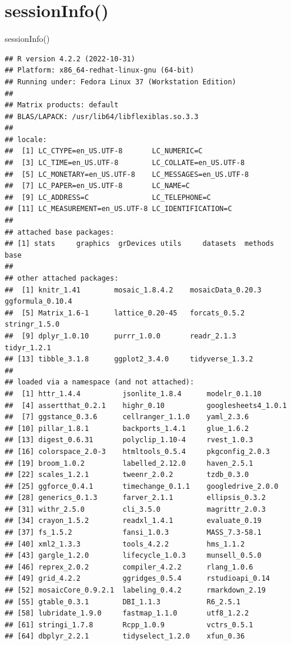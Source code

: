 \documentclass[
  10pt,
]{article}
\newenvironment{Shaded}{\begin{snugshade}}{\end{snugshade}}
\newcommand{\FunctionTok}[1]{\textcolor[rgb]{0.00,0.00,0.00}{#1}}
\newcommand{\NormalTok}[1]{#1}
\begin{document}
\hypertarget{sessioninfo}{%
\section{sessionInfo()}\label{sessioninfo}}

\begin{Shaded}
\begin{Highlighting}[]
\FunctionTok{sessionInfo}\NormalTok{()}
\end{Highlighting}
\end{Shaded}

\begin{verbatim}
## R version 4.2.2 (2022-10-31)
## Platform: x86_64-redhat-linux-gnu (64-bit)
## Running under: Fedora Linux 37 (Workstation Edition)
## 
## Matrix products: default
## BLAS/LAPACK: /usr/lib64/libflexiblas.so.3.3
## 
## locale:
##  [1] LC_CTYPE=en_US.UTF-8       LC_NUMERIC=C              
##  [3] LC_TIME=en_US.UTF-8        LC_COLLATE=en_US.UTF-8    
##  [5] LC_MONETARY=en_US.UTF-8    LC_MESSAGES=en_US.UTF-8   
##  [7] LC_PAPER=en_US.UTF-8       LC_NAME=C                 
##  [9] LC_ADDRESS=C               LC_TELEPHONE=C            
## [11] LC_MEASUREMENT=en_US.UTF-8 LC_IDENTIFICATION=C       
## 
## attached base packages:
## [1] stats     graphics  grDevices utils     datasets  methods   base     
## 
## other attached packages:
##  [1] knitr_1.41        mosaic_1.8.4.2    mosaicData_0.20.3 ggformula_0.10.4 
##  [5] Matrix_1.6-1      lattice_0.20-45   forcats_0.5.2     stringr_1.5.0    
##  [9] dplyr_1.0.10      purrr_1.0.0       readr_2.1.3       tidyr_1.2.1      
## [13] tibble_3.1.8      ggplot2_3.4.0     tidyverse_1.3.2  
## 
## loaded via a namespace (and not attached):
##  [1] httr_1.4.4          jsonlite_1.8.4      modelr_0.1.10      
##  [4] assertthat_0.2.1    highr_0.10          googlesheets4_1.0.1
##  [7] ggstance_0.3.6      cellranger_1.1.0    yaml_2.3.6         
## [10] pillar_1.8.1        backports_1.4.1     glue_1.6.2         
## [13] digest_0.6.31       polyclip_1.10-4     rvest_1.0.3        
## [16] colorspace_2.0-3    htmltools_0.5.4     pkgconfig_2.0.3    
## [19] broom_1.0.2         labelled_2.12.0     haven_2.5.1        
## [22] scales_1.2.1        tweenr_2.0.2        tzdb_0.3.0         
## [25] ggforce_0.4.1       timechange_0.1.1    googledrive_2.0.0  
## [28] generics_0.1.3      farver_2.1.1        ellipsis_0.3.2     
## [31] withr_2.5.0         cli_3.5.0           magrittr_2.0.3     
## [34] crayon_1.5.2        readxl_1.4.1        evaluate_0.19      
## [37] fs_1.5.2            fansi_1.0.3         MASS_7.3-58.1      
## [40] xml2_1.3.3          tools_4.2.2         hms_1.1.2          
## [43] gargle_1.2.0        lifecycle_1.0.3     munsell_0.5.0      
## [46] reprex_2.0.2        compiler_4.2.2      rlang_1.0.6        
## [49] grid_4.2.2          ggridges_0.5.4      rstudioapi_0.14    
## [52] mosaicCore_0.9.2.1  labeling_0.4.2      rmarkdown_2.19     
## [55] gtable_0.3.1        DBI_1.1.3           R6_2.5.1           
## [58] lubridate_1.9.0     fastmap_1.1.0       utf8_1.2.2         
## [61] stringi_1.7.8       Rcpp_1.0.9          vctrs_0.5.1        
## [64] dbplyr_2.2.1        tidyselect_1.2.0    xfun_0.36
\end{verbatim}
\end{document}
